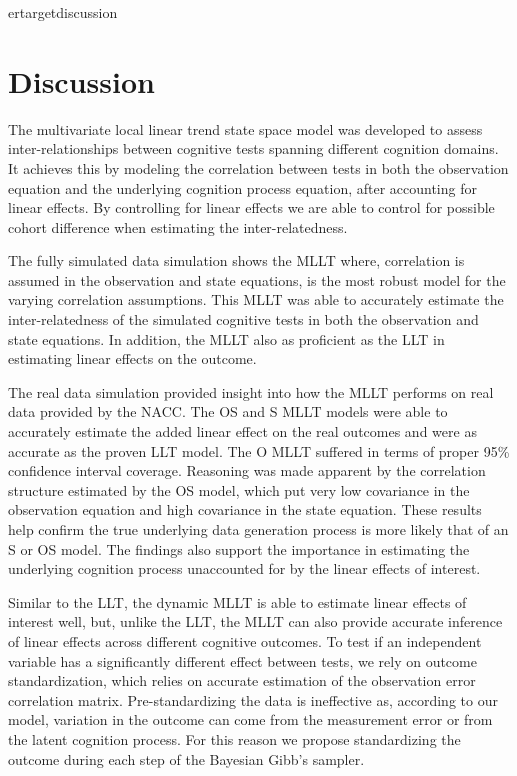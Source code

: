 \documentclass[
]{article}
\begin{document}
ertarget{discussion}{%
\section{Discussion}\label{discussion}}

The multivariate local linear trend state space model was developed to assess inter-relationships between cognitive tests spanning different cognition domains. It achieves this by modeling the correlation between tests in both the observation equation and the underlying cognition process equation, after accounting for linear effects. By controlling for linear effects we are able to control for possible cohort difference when estimating the inter-relatedness.

The fully simulated data simulation shows the MLLT where, correlation is assumed in the observation and state equations, is the most robust model for the varying correlation assumptions. This MLLT was able to accurately estimate the inter-relatedness of the simulated cognitive tests in both the observation and state equations. In addition, the MLLT also as proficient as the LLT in estimating linear effects on the outcome.

The real data simulation provided insight into how the MLLT performs on real data provided by the NACC. The OS and S MLLT models were able to accurately estimate the added linear effect on the real outcomes and were as accurate as the proven LLT model. The O MLLT suffered in terms of proper 95\% confidence interval coverage. Reasoning was made apparent by the correlation structure estimated by the OS model, which put very low covariance in the observation equation and high covariance in the state equation. These results help confirm the true underlying data generation process is more likely that of an S or OS model. The findings also support the importance in estimating the underlying cognition process unaccounted for by the linear effects of interest.

Similar to the LLT, the dynamic MLLT is able to estimate linear effects of interest well, but, unlike the LLT, the MLLT can also provide accurate inference of linear effects across different cognitive outcomes. To test if an independent variable has a significantly different effect between tests, we rely on outcome standardization, which relies on accurate estimation of the observation error correlation matrix. Pre-standardizing the data is ineffective as, according to our model, variation in the outcome can come from the measurement error or from the latent cognition process. For this reason we propose standardizing the outcome during each step of the Bayesian Gibb's sampler.
\end{document}
